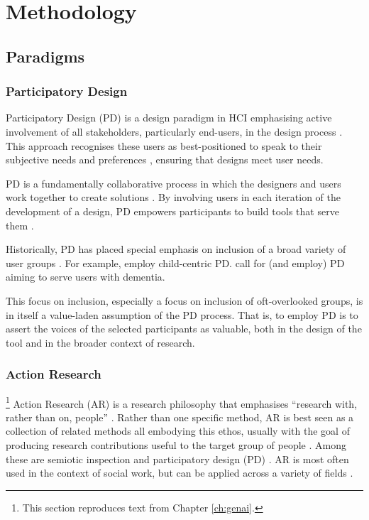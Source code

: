 \chapter{\label{ch:methods}Methodology}

\minitoc

\section{Paradigms}
\subsection{Participatory Design}\label{ssec:participatory_design}
Participatory Design (PD) is a design paradigm in HCI emphasising active involvement of all stakeholders, particularly end-users, in the design process \cite{Hussain2014OverviewOV}. This approach recognises these users as best-positioned to speak to their subjective needs and preferences \cite{Hussain2014OverviewOV}, ensuring that designs meet user needs.

PD is a fundamentally collaborative process in which the designers and users work together to create solutions \cite{Tokranova2022ApplyingPD}. By involving users in each iteration of the development of a design, PD empowers participants to build tools that serve them \cite{Hussain2014OverviewOV}.

Historically, PD has placed special emphasis on inclusion of a broad variety of user groups \cite{Brankaert2019IntersectionsIH}. For example, \textcite{10.1145/3544549.3573821,10.1145/3544548.3580933,Chowdhury2023ReflectionsOO} employ child-centric PD. \textcite{Brankaert2019IntersectionsIH} call for (and employ) PD aiming to serve users with dementia.

This focus on inclusion, especially a focus on inclusion of oft-overlooked groups, is in itself a value-laden assumption of the PD process. That is, to employ PD is to assert the voices of the selected participants as valuable, both in the design of the tool and in the broader context of research.

\subsection{Action Research}\label{ssec:action_research}\footnote{This section reproduces text from Chapter \ref{ch:genai}.}
Action Research (AR) is a research philosophy that emphasises ``research with, rather than on, people'' \cite{bradbury_action_2003}. Rather than one specific method, AR is best seen as a collection of related methods all embodying this ethos, usually with the goal of producing research contributions useful to the target group of people \cite{lu_organizing_2023}. Among these are semiotic inspection \cite{DeSouza_Leitão_2009,Alvarado_Waern_2018} and participatory design  (PD) \cite{braun_using_2006,Griffiths_Johnson_Hartley_2007,blythe2014research,Knapp_Zeratzky_Kowitz_2016}. AR is most often used in the context of social work, but can be applied across a variety of fields \cite{dombrowski_social_2016,lu_organizing_2023}. 

